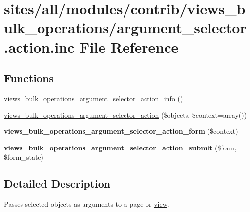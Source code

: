 \hypertarget{argument__selector_8action_8inc}{
\section{sites/all/modules/contrib/views\_\-bulk\_\-operations/argument\_\-selector.action.inc File Reference}
\label{argument__selector_8action_8inc}
}
\subsection*{Functions}
\begin{CompactItemize}
\item 
\hyperlink{argument__selector_8action_8inc_0d4c0d9b920ce67705e560ab1f3940ad}{views\_\-bulk\_\-operations\_\-argument\_\-selector\_\-action\_\-info} ()
\item 
\hyperlink{argument__selector_8action_8inc_b186dcb494cc5ff62044485d5f4d2e6a}{views\_\-bulk\_\-operations\_\-argument\_\-selector\_\-action} (\$objects, \$context=array())
\item 
\hypertarget{argument__selector_8action_8inc_8dd4602521c2da961bf956e66e4794a3}{
\textbf{views\_\-bulk\_\-operations\_\-argument\_\-selector\_\-action\_\-form} (\$context)}
\label{argument__selector_8action_8inc_8dd4602521c2da961bf956e66e4794a3}

\item 
\hypertarget{argument__selector_8action_8inc_cac746dbc382beae41ce006dc85e359d}{
\textbf{views\_\-bulk\_\-operations\_\-argument\_\-selector\_\-action\_\-submit} (\$form, \$form\_\-state)}
\label{argument__selector_8action_8inc_cac746dbc382beae41ce006dc85e359d}

\end{CompactItemize}


\subsection{Detailed Description}
Passes selected objects as arguments to a page or \hyperlink{classview}{view}. 

